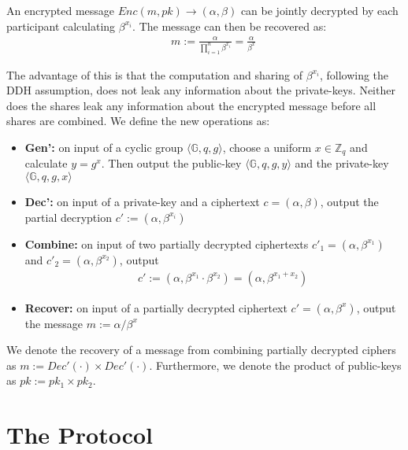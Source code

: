 An encrypted message $Enc(m,pk) \rightarrow ( \alpha, \beta )$ can be jointly decrypted by each participant calculating $\beta^{x_i}$. The message can then be recovered as:
{\setlength{\mathindent}{0cm}
\begin{align*}
&&    m := \frac{\alpha}{\prod^n_{i=1} \beta^{x_i}} = \frac{\alpha}{\beta^{x}}
\end{align*}}

The advantage of this is that the computation and sharing of $\beta^{x_i}$, following the DDH assumption, does not leak any information about the private-keys. Neither does the shares leak any information about the encrypted message before all shares are combined. We define the new operations as:
\begin{itemize}

    \item \textbf{Gen':} on input of a cyclic group $\langle \mathbb{G}, q, g \rangle$, choose a uniform $x \in \mathbb{Z}_q$ and calculate $y = g^{x}$. Then output the public-key $\langle \mathbb{G},q,g,y \rangle$ and the private-key $\langle \mathbb{G},q,g,x \rangle$

    \item \textbf{Dec':} on input of a private-key and a ciphertext $c = ( \alpha, \beta )$, output the partial decryption $c' := ( \alpha, \beta^{x_i} )$
    
    \item \textbf{Combine:} on input of two partially decrypted ciphertexts $c'_1 = ( \alpha, \beta^{x_1} )$ and $c'_2 = ( \alpha, \beta^{x_2} )$, output
    {\setlength{\mathindent}{0cm} 
    \begin{align*}
    && c' := \left( \alpha, \beta^{x_1} \cdot \beta^{x_2} \right) = \left( \alpha, \beta^{{x_1}+{x_2}} \right)
    \end{align*}}\vspace{-2em}
    
    \item \textbf{Recover:} on input of a partially decrypted ciphertext $c' = ( \alpha, \beta^x )$, output the message $m := \alpha / \beta^x$
    
\end{itemize}

We denote the recovery of a message from combining partially decrypted ciphers as $m := Dec'(\cdot) \times Dec'(\cdot)$. Furthermore, we denote the product of public-keys as $pk := pk_1 \times pk_2$.

\section{The Protocol}

